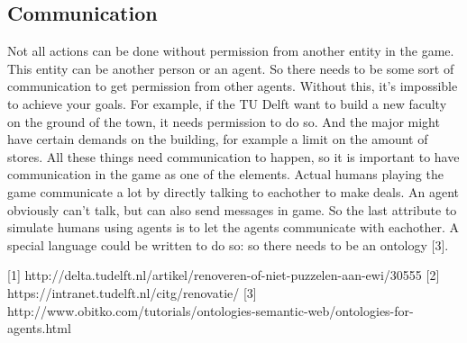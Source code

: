 \subsection{Communication}
Not all actions can be done without permission from another entity in the game. This entity can be another person or an agent. So there needs to be some sort of communication to get permission from other agents. Without this, it's impossible to achieve your goals. For example, if the TU Delft want to build a new faculty on the ground of the town, it needs permission to do so. And the major might have certain demands on the building, for example a limit on the amount of stores. All these things need communication to happen, so it is important to have communication in the game as one of the elements. Actual humans playing the game communicate a lot by directly talking to eachother to make deals. An agent obviously can't talk, but can also send messages in game. So the last attribute to simulate humans using agents is to let the agents communicate with eachother. A special language could be written to do so: so there needs to be an ontology [3].

[1] http://delta.tudelft.nl/artikel/renoveren-of-niet-puzzelen-aan-ewi/30555
[2] https://intranet.tudelft.nl/citg/renovatie/
[3] http://www.obitko.com/tutorials/ontologies-semantic-web/ontologies-for-agents.html